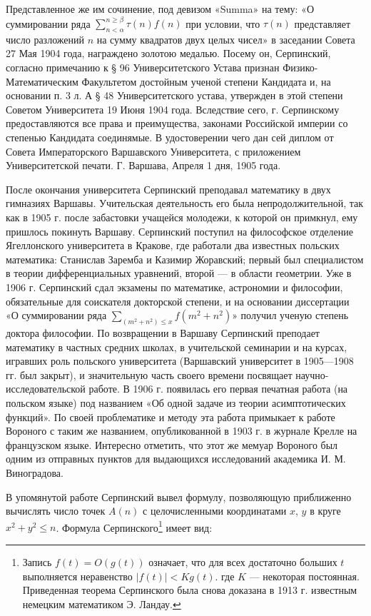 \documentclass[12pt, a4paper, openany]{book}
\begin{document}
\hangindent=1.5cm  Представленное же им сочинение, под девизом «Summa» на тему: «О суммировании ряда $ \sum_{n<\alpha}^{n\geqslant\beta} \tau(n)f(n) $ при условии, что $\tau(n) $ представляет число разложений $n $ на сумму квадратов двух целых чисел» в заседании Совета 27 Мая 1904 года, награждено золотою медалью. Посему он, Серпинский, согласно примечанию к § 96 Университетского Устава признан Физико-Математическим Факультетом достойным ученой степени Кандидата и, на основании п. 3 л. А § 48 Университетского устава, утвержден в этой степени Советом Университета 19 Июня 1904 года. Вследствие сего, г. Серпинскому предоставляются все права и преимущества, законами Российской империи со степенью Кандидата соединямые. В удостоверении чего дан сей диплом от Совета Императорского Варшавского Университета, с приложением Университетской печати. Г. Варшава, Апреля 1 дня, 1905 года.
	
После окончания университета Серпинский преподавал математику в двух гимназиях Варшавы. Учительская деятельность его была непродолжительной, так как в 1905 г. после забастовки учащейся молодежи, к которой он примкнул, ему пришлось покинуть Варшаву. Серпинский поступил на философское отделение Ягеллонского университета в Кракове, где работали два известных польских математика: Станислав Заремба и Казимир Жоравский; первый был специалистом в теории дифференциальных уравнений, второй — в области геометрии. Уже в 1906 г. Серпинский сдал экзамены по математике, астрономии и философии, обязательные для соискателя докторской степени, и на основании диссертации «О суммировании ряда $ \sum_{(m^2+n^2)\leqslant x} f(m^2+n^2) $» получил ученую степень доктора философии. По возвращении в Варшаву Серпинский преподает математику в частных средних школах, в учительской семинарии и на курсах, игравших роль польского университета (Варшавский университет в 1905—1908 гг. был закрыт), и значительную часть своего времени посвящает научно-исследовательской работе. В 1906 г. появилась его первая печатная работа (на польском языке) под названием «Об одной задаче из теории асимптотических функций». По своей проблематике и методу эта работа примыкает к работе Вороного с таким же названием, опубликованной в 1903 г. в журнале Крелле на французском языке. Интересно отметить, что этот же мемуар Вороного был одним из отправных пунктов для выдающихся исследований академика И. М. Виноградова.

В упомянутой работе Серпинский вывел формулу, позволяющую приближенно вычислять число точек $A(n)$ с целочисленными координатами $x$, $y$ в круге $x^2+y^2\leqslant n$. Формула Серпинского{\footnote{Запись $f(t) = O(g(t))$ означает, что для всех достаточно больших $t$ выполняется неравенство $|f(t)| < Kg(t)$. где $K$ — некоторая постоянная. Приведенная теорема Серпинского была снова доказана в 1913 г. известным немецким математиком Э. Ландау.}} имеет вид:
\end{document}
